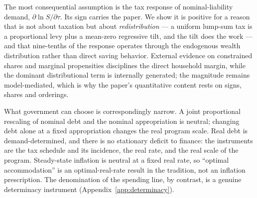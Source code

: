 \documentclass[12pt]{article}
\newcommand{\Sfun}{S}
\begin{document}
The most consequential assumption is the tax response of nominal-liability
demand, $\partial\ln\Sfun/\partial\tau$. Its sign carries the paper. We show
it is positive for a reason that is not about taxation but about
\emph{redistribution} --- a uniform lump-sum tax is a proportional levy plus
a mean-zero regressive tilt, and the tilt does the work --- and that
nine-tenths of the response operates through the endogenous wealth
distribution rather than direct saving behavior. External evidence on
constrained shares and marginal propensities disciplines the direct
household margin, while the dominant distributional term is internally
generated; the
magnitude remains model-mediated, which is why the paper's quantitative
content rests on signs, shares and orderings.

What government can choose is correspondingly narrow. A joint proportional
rescaling of nominal debt and the nominal appropriation is neutral; changing
debt alone at a fixed appropriation changes the real program scale. Real debt
is demand-determined, and there is no stationary
deficit to finance: the instruments are the tax schedule and its incidence,
the real rate, and the real scale of the program. Steady-state inflation is
neutral at a fixed real rate, so ``optimal accommodation'' is an
optimal-real-rate result in the \citet{aiyagarimcgrattan1998} tradition, not
an inflation prescription. The denomination of the spending line, by
contrast, is a genuine determinacy instrument
(Appendix~\ref{app:determinacy}).
\end{document}
